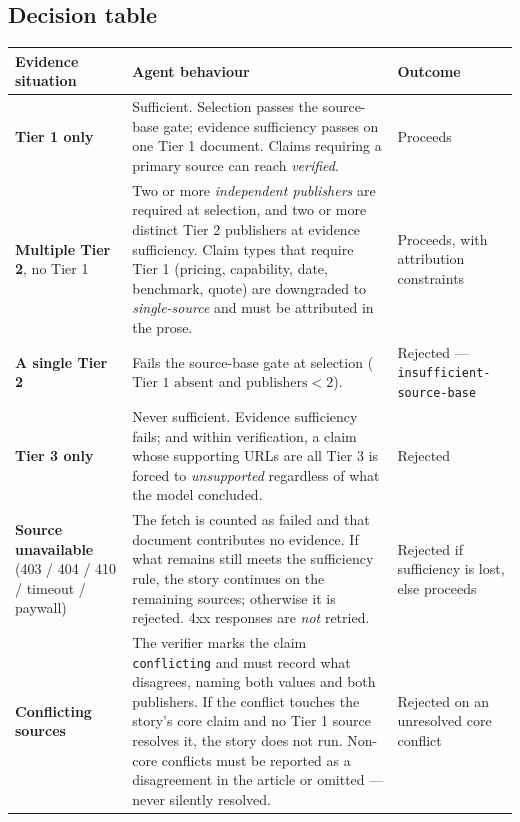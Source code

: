 \documentclass[11pt,a4paper]{article}
\newcommand{\brk}{\hyphenpenalty=0\exhyphenpenalty=0\relax}
\newcommand{\code}[1]{\texttt{\small\brk #1}}
\begin{document}
\subsection{Decision table}

\begin{center}
\small
\begin{tabularx}{\textwidth}{@{}p{3.6cm} >{\RaggedRight}X >{\RaggedRight}p{4.0cm}@{}}
\toprule
\textbf{Evidence situation} & \textbf{Agent behaviour} & \textbf{Outcome} \\
\midrule
\textbf{Tier 1 only} &
Sufficient. Selection passes the source-base gate; evidence sufficiency passes on
one Tier 1 document. Claims requiring a primary source can reach \emph{verified}. &
\textcolor{aitkGo}{Proceeds} \\

\textbf{Multiple Tier 2}, no Tier 1 &
Two or more \emph{independent publishers} are required at selection, and two or
more distinct Tier 2 publishers at evidence sufficiency. Claim types that require
Tier 1 (pricing, capability, date, benchmark, quote) are downgraded to
\emph{single-source} and must be attributed in the prose. &
\textcolor{aitkGo}{Proceeds, with attribution constraints} \\

\textbf{A single Tier 2} &
Fails the source-base gate at selection ($\text{Tier 1 absent}$ and
$\text{publishers} < 2$). &
\textcolor{aitkStop}{Rejected} --- \code{insufficient-}\allowbreak\code{source-base} \\

\textbf{Tier 3 only} &
Never sufficient. Evidence sufficiency fails; and within verification, a claim
whose supporting URLs are all Tier 3 is forced to \emph{unsupported} regardless of
what the model concluded. &
\textcolor{aitkStop}{Rejected} \\

\textbf{Source unavailable} (403 / 404 / 410 / timeout / paywall) &
The fetch is counted as failed and that document contributes no evidence. If what
remains still meets the sufficiency rule, the story continues on the remaining
sources; otherwise it is rejected. 4xx responses are \emph{not} retried. &
\textcolor{aitkStop}{Rejected} if sufficiency is lost, else proceeds \\

\textbf{Conflicting sources} &
The verifier marks the claim \code{conflicting} and must record what disagrees,
naming both values and both publishers. If the conflict touches the story's core
claim and no Tier 1 source resolves it, the story does not run. Non-core conflicts
must be reported as a disagreement in the article or omitted --- never silently
resolved. &
\textcolor{aitkStop}{Rejected} on an unresolved core conflict \\
\bottomrule
\end{tabularx}
\end{center}
\end{document}
